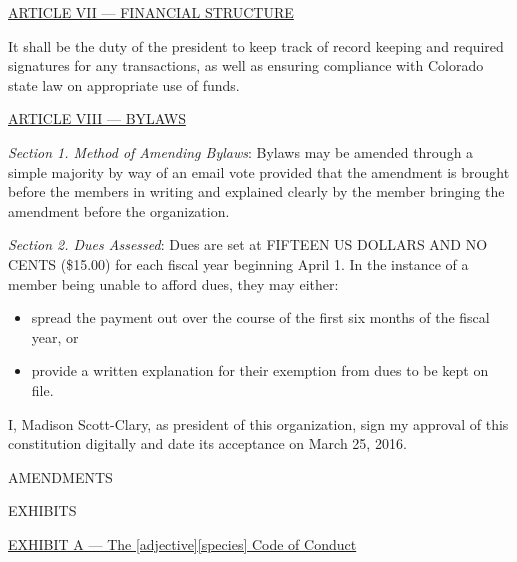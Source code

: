 \documentclass{article}
\begin{document}
\bigskip

\large{\underline{ARTICLE VII --- FINANCIAL STRUCTURE}}

It shall be the duty of the president to keep track of record keeping and required signatures for any transactions, as well as ensuring compliance with Colorado state law on appropriate use of funds.

\newpage

\large{\underline{ARTICLE VIII --- BYLAWS}}

\emph{Section 1. Method of Amending Bylaws}: Bylaws may be amended through a simple majority by way of an email vote provided that the amendment is brought before the members in writing and explained clearly by the member bringing the amendment before the organization.

\emph{Section 2. Dues Assessed}: Dues are set at FIFTEEN US DOLLARS AND NO CENTS (\$15.00) for each fiscal year beginning April 1.  In the instance of a member being unable to afford dues, they may either:
\begin{itemize}
  \item spread the payment out over the course of the first six months of the fiscal year, or
  \item provide a written explanation for their exemption from dues to be kept on file.
\end{itemize}

\bigskip

I, Madison Scott-Clary, as president of this organization, sign my approval of this constitution digitally and date its acceptance on March 25, 2016.

\bigskip

\newpage

\begin{center}
\Huge{AMENDMENTS}
\end{center}

\newpage

\begin{center}
\Huge{EXHIBITS}
\end{center}

\large{\underline{EXHIBIT A --- The [adjective][species] Code of Conduct}}


\end{document}
